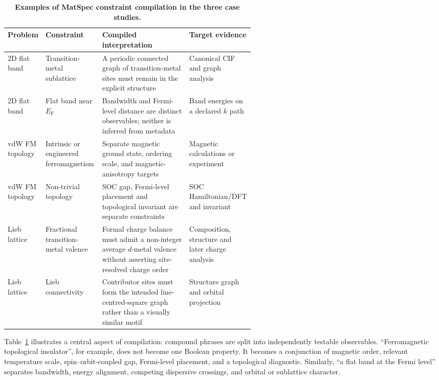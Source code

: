 \begin{table}[t]
    \centering
    \caption{\textbf{Examples of MatSpec constraint compilation in the three case studies.}}
    \label{tab:constraints}
    \small
    \setlength{\tabcolsep}{4pt}
    \renewcommand{\arraystretch}{1.13}
    \begin{tabularx}{\linewidth}{>{\raggedright\arraybackslash}p{0.15\linewidth}>{\raggedright\arraybackslash}p{0.23\linewidth}X>{\raggedright\arraybackslash}p{0.18\linewidth}}
        \toprule
        \textbf{Problem} & \textbf{Constraint} & \textbf{Compiled interpretation} & \textbf{Target evidence} \\
        \midrule
        2D flat band & Transition-metal sublattice & A periodic connected graph of transition-metal sites must remain in the explicit structure & Canonical CIF and graph analysis \\
        2D flat band & Flat band near $E_\mathrm{F}$ & Bandwidth and Fermi-level distance are distinct observables; neither is inferred from metadata & Band energies on a declared $k$ path \\
        vdW FM topology & Intrinsic or engineered ferromagnetism & Separate magnetic ground state, ordering scale, and magnetic-anisotropy targets & Magnetic calculations or experiment \\
        vdW FM topology & Non-trivial topology & SOC gap, Fermi-level placement and topological invariant are separate constraints & SOC Hamiltonian/DFT and invariant \\
        Lieb lattice & Fractional transition-metal valence & Formal charge balance must admit a non-integer average $d$-metal valence without asserting site-resolved charge order & Composition, structure and later charge analysis \\
        Lieb lattice & Lieb connectivity & Contributor sites must form the intended line-centred-square graph rather than a visually similar motif & Structure graph and orbital projection \\
        \bottomrule
    \end{tabularx}
\end{table}

Table~\ref{tab:constraints} illustrates a central aspect of compilation: compound phrases are split into independently testable observables.  ``Ferromagnetic topological insulator'', for example, does not become one Boolean property.  It becomes a conjunction of magnetic order, relevant temperature scale, spin--orbit-coupled gap, Fermi-level placement, and a topological diagnostic.  Similarly, ``a flat band at the Fermi level'' separates bandwidth, energy alignment, competing dispersive crossings, and orbital or sublattice character.

